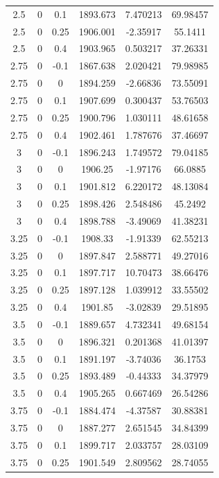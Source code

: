 \begin{longtable}{|c|c|c|c|c|c|}
	2.5   & 0     & 0.1   & 1893.673 & 7.470213 & 69.98457 \\
	2.5   & 0     & 0.25  & 1906.001 & -2.35917 & 55.1411 \\
	2.5   & 0     & 0.4   & 1903.965 & 0.503217 & 37.26331 \\
	2.75  & 0     & -0.1  & 1867.638 & 2.020421 & 79.98985 \\
	2.75  & 0     & 0     & 1894.259 & -2.66836 & 73.55091 \\
	2.75  & 0     & 0.1   & 1907.699 & 0.300437 & 53.76503 \\
	2.75  & 0     & 0.25  & 1900.796 & 1.030111 & 48.61658 \\
	2.75  & 0     & 0.4   & 1902.461 & 1.787676 & 37.46697 \\
	3     & 0     & -0.1  & 1896.243 & 1.749572 & 79.04185 \\
	3     & 0     & 0     & 1906.25 & -1.97176 & 66.0885 \\
	3     & 0     & 0.1   & 1901.812 & 6.220172 & 48.13084 \\
	3     & 0     & 0.25  & 1898.426 & 2.548486 & 45.2492 \\
	3     & 0     & 0.4   & 1898.788 & -3.49069 & 41.38231 \\
	3.25  & 0     & -0.1  & 1908.33 & -1.91339 & 62.55213 \\
	3.25  & 0     & 0     & 1897.847 & 2.588771 & 49.27016 \\
	3.25  & 0     & 0.1   & 1897.717 & 10.70473 & 38.66476 \\
	3.25  & 0     & 0.25  & 1897.128 & 1.039912 & 33.55502 \\
	3.25  & 0     & 0.4   & 1901.85 & -3.02839 & 29.51895 \\
	3.5   & 0     & -0.1  & 1889.657 & 4.732341 & 49.68154 \\
	3.5   & 0     & 0     & 1896.321 & 0.201368 & 41.01397 \\
	3.5   & 0     & 0.1   & 1891.197 & -3.74036 & 36.1753 \\
	3.5   & 0     & 0.25  & 1893.489 & -0.44333 & 34.37979 \\
	3.5   & 0     & 0.4   & 1905.265 & 0.667469 & 26.54286 \\
	3.75  & 0     & -0.1  & 1884.474 & -4.37587 & 30.88381 \\
	3.75  & 0     & 0     & 1887.277 & 2.651545 & 34.84399 \\
	3.75  & 0     & 0.1   & 1899.717 & 2.033757 & 28.03109 \\
	3.75  & 0     & 0.25  & 1901.549 & 2.809562 & 28.74055 \\

\end{longtable}

